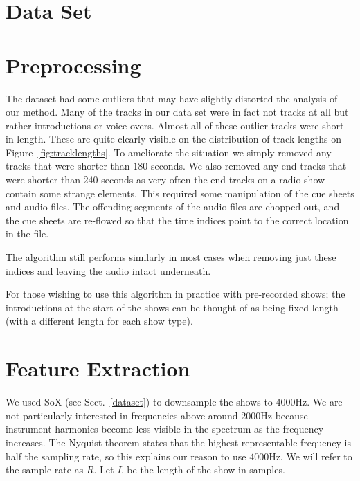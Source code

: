 \documentclass[twocolumn]{article}
\begin{document}
\section{Data Set}\label{data_set}



\section{Preprocessing}\label{proprocessing} %

The dataset had some outliers that may have slightly distorted the analysis of our method. Many of the tracks in our data set were in fact not tracks at all but rather introductions or voice-overs. Almost all of these outlier tracks were short in length. These are quite clearly visible on the distribution of track lengths on Figure~\ref{fig:tracklengths}. To ameliorate the situation we simply removed any tracks that were shorter than $180$ seconds. We also removed any end tracks that were shorter than $240$ seconds as very often the end tracks on a radio show contain some strange elements. This required some manipulation of the cue sheets and audio files. The offending segments of the audio files are chopped out, and the cue sheets are re-flowed so that the time indices point to the correct location in the file. 

The algorithm still performs similarly in most cases when removing just these indices and leaving the audio intact underneath. 

 For those wishing to use this algorithm in practice with pre-recorded shows; the introductions at the start of the shows can be thought of as being fixed length (with a different length for each show type).

\section{Feature Extraction}\label{feat_ex} %

We used SoX (see Sect.~\ref{dataset}) to downsample the shows to $4000$Hz. We are not particularly interested in frequencies above around $2000$Hz because instrument harmonics become less visible in the spectrum as the frequency increases. The Nyquist theorem \cite{nyquist1928certain} states that the highest representable frequency is half the sampling rate, so this explains our reason to use $4000$Hz. We will refer to the sample rate as $R$. Let $L$ be the length of the show in samples.
\end{document}
